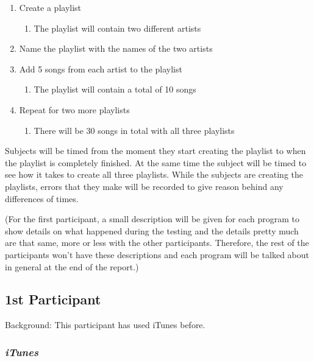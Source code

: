 \documentclass{article}
\begin{document}
{\begin{enumerate}
  \item Create a playlist
  \begin{enumerate}
    \item The playlist will contain two different artists
  \end{enumerate}
  \item Name the playlist with the names of the two artists
  \item Add 5 songs from each artist to the playlist
  \begin{enumerate}
    \item The playlist will contain a total of 10 songs 
  \end{enumerate}
  \item Repeat for two more playlists
  \begin{enumerate}
    \item There will be 30 songs in total with all three playlists
  \end{enumerate} 
\end{enumerate}

Subjects will be timed from the moment they start creating the playlist to when the playlist is completely finished. At the same time the subject will be timed to see how it takes to create all three playlists. While the subjects are creating the playlists, errors that they make will be recorded to give reason behind any differences of times.

(For the first participant, a small description will be given for each program to show details on what happened during the testing and the details pretty much are that same, more or less with the other participants. Therefore, the rest of the participants won't have these descriptions and each program will be talked about in general at the end of the report.) 

\begin{multicols}{2}
\subsection{1st Participant}
Background: This participant has used iTunes before. 

\subsubsection{\it iTunes}


\end{multicols}}
\end{document}
